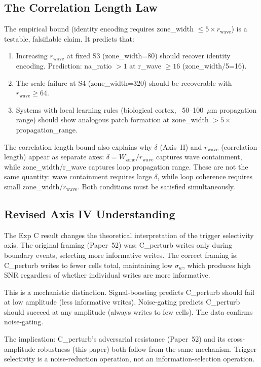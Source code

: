 \documentclass[11pt,a4paper]{article}
\begin{document}
\subsection{The Correlation Length Law}

The empirical bound (identity encoding requires
zone\_width $\leq 5 \times r_\text{wave}$) is a testable, falsifiable claim.
It predicts that:
\begin{enumerate}
  \item Increasing $r_\text{wave}$ at fixed S3 (zone\_width=80) should
    recover identity encoding.
    Prediction: na\_ratio $> 1$ at r\_wave $\geq 16$ (zone\_width/5=16).
  \item The scale failure at S4 (zone\_width=320) should be recoverable with
    $r_\text{wave} \geq 64$.
  \item Systems with local learning rules (biological cortex, ~50--100~$\mu$m
    propagation range) should show analogous patch formation at
    zone\_width $> 5 \times$ propagation\_range.
\end{enumerate}

The correlation length bound also explains why $\delta$ (Axis~II) and
$r_\text{wave}$ (correlation length) appear as separate axes:
$\delta = W_\text{zone}/r_\text{wave}$ captures wave containment,
while zone\_width/r\_wave captures loop propagation range.
These are not the same quantity: wave containment requires large $\delta$,
while loop coherence requires small zone\_width/$r_\text{wave}$.
Both conditions must be satisfied simultaneously.

\subsection{Revised Axis IV Understanding}

The Exp C result changes the theoretical interpretation of the trigger
selectivity axis.
The original framing (Paper~52) was: C\_perturb writes only during boundary
events, selecting more informative writes.
The correct framing is: C\_perturb writes to fewer cells total, maintaining
low $\sigma_w$, which produces high SNR regardless of whether individual
writes are more informative.

This is a mechanistic distinction.
Signal-boosting predicts C\_perturb should fail at low amplitude (less
informative writes).
Noise-gating predicts C\_perturb should succeed at any amplitude (always writes
to few cells).
The data confirms noise-gating.

The implication: C\_perturb's adversarial resistance (Paper~52) and its
cross-amplitude robustness (this paper) both follow from the same mechanism.
Trigger selectivity is a noise-reduction operation, not an information-selection
operation.
\end{document}
